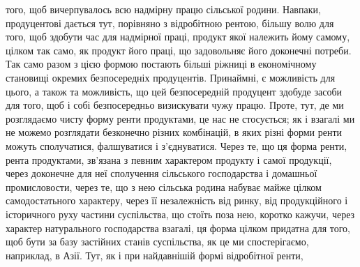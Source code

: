 того, щоб вичерпувалось всю надмірну працю сільської родини. Навпаки, продуцентові
дається тут, порівняно з відробітною рентою, більшу волю для того, щоб
здобути час для надмірної праці, продукт якої належить йому самому, цілком так
само, як продукт його праці, що задовольняє його доконечні потреби. Так само
разом з цією формою постають більші ріжниці в економічному становищі окремих
безпосередніх продуцентів. Принаймні, є можливість для цього, а також та
можливість, що цей безпосередній продуцент здобуде засоби для того, щоб і
собі безпосередньо визискувати чужу працю. Проте, тут, де ми розглядаємо
чисту форму ренти продуктами, це нас не стосується; як і взагалі ми не можемо
розглядати безконечно різних комбінацій, в яких різні форми ренти
можуть сполучатися, фалшуватися і з’єднуватися. Через те, що ця форма
ренти, рента продуктами, зв’язана з певним характером продукту і самої продукції,
через доконечне для неї сполучення сільського господарства і домашньої
промисловости, через те, що з нею сільська родина набуває майже цілком
самодостатьного характеру, через її незалежність від ринку, від продукційного
і історичного руху частини суспільства, що стоїть поза нею, коротко кажучи,
через характер натурального господарства взагалі, ця форма цілком придатна
для того, щоб бути за базу застійних станів суспільства, як це ми спостерігаємо,
наприклад, в Азії. Тут, як і при найдавнішій формі відробітної ренти,
\parbreak{}  %
